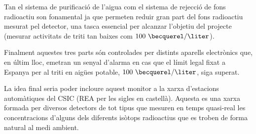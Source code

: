Tan el sistema de purificació de l'aigua com el sistema de rejecció de fons radioactiu son fonamental ja que permeten reduir gran part del fons radioactiu mesurat pel detector, una tasca essencial per alcanzar l'objetiu del projecte (mesurar activitats de triti tan baixes com $100~\becquerel/\liter$).

Finalment aquestes tres parts són controlades per distints aparells electrònics que, en últim lloc, emetran un senyal d'alarma en cas que el límit legal fixat a Espanya per al triti en aigües potable, $100~\becquerel/\liter$, siga superat.

La idea final seria poder incloure aquest monitor a la xarxa d'estacions automàtiques del CSIC\cite{REA} (REA per les sigles en castellà). Aquesta es una xarxa formada per diversos detectors de tot tipus que mesuren en temps quasi-real les concentracions d'alguns dels diferents isòtops radioactius que es troben de forma natural al medi ambient. 